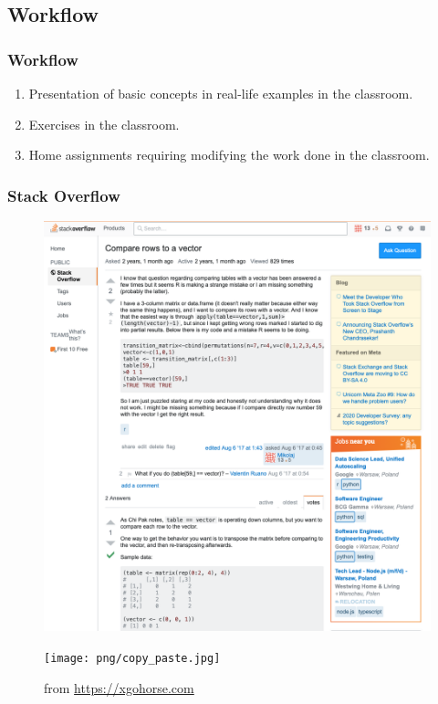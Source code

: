 \subsection[Workflow]{Workflow}
\begin{frame}
    \frametitle{Workflow}
    \begin{enumerate}
        \item Presentation of basic concepts in real-life examples in the classroom.
        \item Exercises in the classroom.
        \item Home assignments requiring modifying the work done in the classroom.
        \end{enumerate}
    \end{frame}

\begin{frame}
    \frametitle{Stack Overflow}
    \begin{overprint}
        \onslide<+>
            \begin{figure}
                \centering
                \includegraphics[scale = .3]{png/stack_overflow.png}
            \end{figure}
        \onslide<+>
            \begin{figure}
                \centering
                \texttt{[image: png/copy\_paste.jpg]}
                \caption{from \href{https://xgohorse.com}{https://xgohorse.com}}
            \end{figure}
    \end{overprint}
\end{frame}

